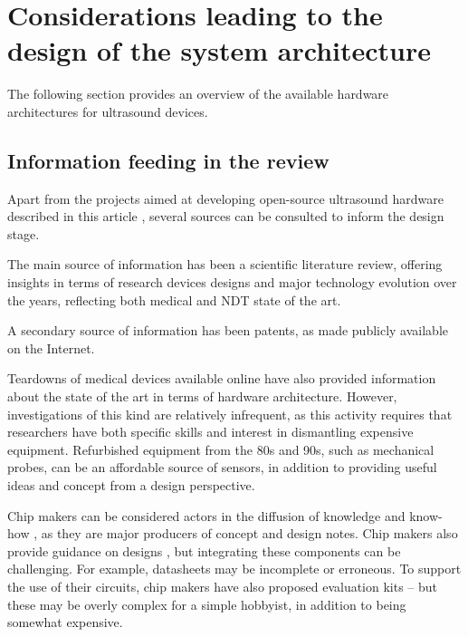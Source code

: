 \documentclass{article}
\begin{document}





\newpage
\section{Considerations leading to the design of the system architecture}

The following section provides an overview of the available hardware architectures for ultrasound devices.

\subsection{Information feeding in the review}

Apart from the projects aimed at developing open-source ultrasound hardware described in this article  \cite{roman_open-source_2019,jonveaux_arduino-like_2017, luc_jonveaux_un0rick_2019}, several sources can be consulted to inform the design stage.

The main source of information has been a scientific literature review, offering insights in terms of research devices designs and major technology evolution over the years, reflecting both medical and NDT state of the art.

A secondary source of information has been patents, as made publicly available on the Internet. 

Teardowns of medical devices available online have also provided information about the state of the art in terms of hardware architecture. However, investigations of this kind are relatively infrequent, as this activity requires that researchers have both specific skills and interest in dismantling expensive equipment. Refurbished equipment from the 80s and 90s, such as mechanical probes, can be an affordable source of sensors, in addition to providing useful ideas and concept  from a design perspective.  

Chip makers can be considered actors in the diffusion of knowledge and know-how \cite{brunner_how_2002, xu_challenges_2010}, as they are major producers of concept and design notes. Chip makers also provide guidance on designs \cite{ching_chu_designing_nodate}, but integrating these components can be challenging. For example, datasheets may be incomplete or erroneous. To support the use of their circuits, chip makers have also proposed evaluation kits -- but these may be overly complex for a simple hobbyist, in addition to being somewhat expensive.
\end{document}
